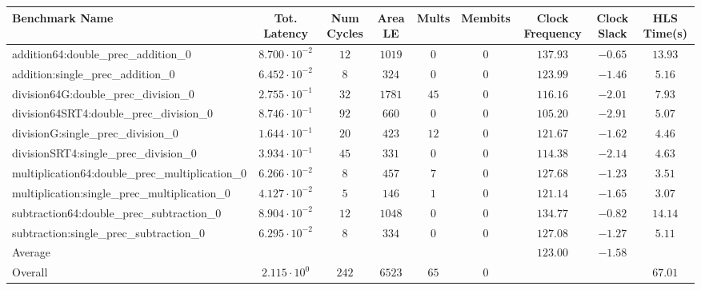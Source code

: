 \begin{tabular}{|l|c|c|c|c|c|c|c|c|}
\hline
Benchmark Name                                   & Tot. Latency            & Num Cycles & Area LE  & Mults  & Membits & Clock Frequency & Clock Slack & HLS Time(s) \\
\hline
addition64:double\_prec\_addition\_0             & $ 8.700 \cdot 10^{-2} $ & $ 12     $ & $ 1019 $ & $ 0  $ & $ 0   $ & $ 137.93      $ & $ -0.65   $ & $ 13.93   $ \\
addition:single\_prec\_addition\_0               & $ 6.452 \cdot 10^{-2} $ & $ 8      $ & $ 324  $ & $ 0  $ & $ 0   $ & $ 123.99      $ & $ -1.46   $ & $ 5.16    $ \\
division64G:double\_prec\_division\_0            & $ 2.755 \cdot 10^{-1} $ & $ 32     $ & $ 1781 $ & $ 45 $ & $ 0   $ & $ 116.16      $ & $ -2.01   $ & $ 7.93    $ \\
division64SRT4:double\_prec\_division\_0         & $ 8.746 \cdot 10^{-1} $ & $ 92     $ & $ 660  $ & $ 0  $ & $ 0   $ & $ 105.20      $ & $ -2.91   $ & $ 5.07    $ \\
divisionG:single\_prec\_division\_0              & $ 1.644 \cdot 10^{-1} $ & $ 20     $ & $ 423  $ & $ 12 $ & $ 0   $ & $ 121.67      $ & $ -1.62   $ & $ 4.46    $ \\
divisionSRT4:single\_prec\_division\_0           & $ 3.934 \cdot 10^{-1} $ & $ 45     $ & $ 331  $ & $ 0  $ & $ 0   $ & $ 114.38      $ & $ -2.14   $ & $ 4.63    $ \\
multiplication64:double\_prec\_multiplication\_0 & $ 6.266 \cdot 10^{-2} $ & $ 8      $ & $ 457  $ & $ 7  $ & $ 0   $ & $ 127.68      $ & $ -1.23   $ & $ 3.51    $ \\
multiplication:single\_prec\_multiplication\_0   & $ 4.127 \cdot 10^{-2} $ & $ 5      $ & $ 146  $ & $ 1  $ & $ 0   $ & $ 121.14      $ & $ -1.65   $ & $ 3.07    $ \\
subtraction64:double\_prec\_subtraction\_0       & $ 8.904 \cdot 10^{-2} $ & $ 12     $ & $ 1048 $ & $ 0  $ & $ 0   $ & $ 134.77      $ & $ -0.82   $ & $ 14.14   $ \\
subtraction:single\_prec\_subtraction\_0         & $ 6.295 \cdot 10^{-2} $ & $ 8      $ & $ 334  $ & $ 0  $ & $ 0   $ & $ 127.08      $ & $ -1.27   $ & $ 5.11    $ \\
\hline
Average                                          & $                     $ & $        $ & $      $ & $    $ & $     $ & $ 123.00      $ & $ -1.58   $ & $         $ \\
\hline
Overall                                          & $ 2.115 \cdot 10^{0}  $ & $ 242    $ & $ 6523 $ & $ 65 $ & $ 0   $ & $             $ & $         $ & $ 67.01   $ \\
\hline
\end{tabular}
